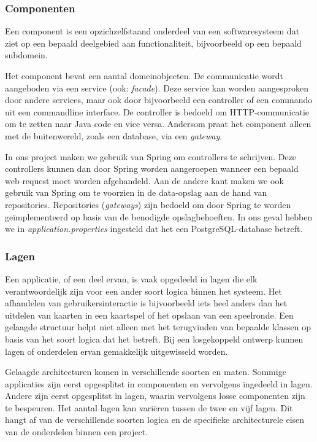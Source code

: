 \subsubsection{Componenten}
Een component is een opzichzelfstaand onderdeel van een softwaresysteem
dat ziet op een bepaald deelgebied aan functionaliteit, bijvoorbeeld op een 
bepaald subdomein.

Het component bevat een aantal domeinobjecten. 
De communicatie wordt aangeboden via een service (ook: \textit{facade}). 
Deze service kan worden aangesproken door andere
services, maar ook door bijvoorbeeld een controller of een commando uit een commandline interface. 
De controller is bedoeld om HTTP-communicatie om te zetten naar Java code en vice versa. 
Andersom praat het component alleen met de buitenwereld, zoals een database, via een \textit{gateway}.

In ons project maken we gebruik van Spring om controllers te schrijven.
Deze controllers kunnen dan door Spring worden aangeroepen 
wanneer een bepaald web request moet worden afgehandeld.
Aan de andere kant maken we ook gebruik van Spring om te voorzien in 
de data-opslag aan de hand van repositories.
Repositories (\textit{gateways}) zijn bedoeld om door Spring 
te worden geïmplementeerd op basis van de benodigde opslagbehoeften.
In ons geval hebben we in \textit{application.properties} ingesteld dat het 
een PostgreSQL-database betreft.

\subsubsection{Lagen}
Een applicatie, of een deel ervan, is vaak opgedeeld in lagen die 
elk verantwoordelijk zijn voor een ander soort logica binnen het systeem.
Het afhandelen van gebruikersinteractie 
is bijvoorbeeld iets heel anders dan het uitdelen van kaarten in een
kaartspel of het opslaan van een speelronde.
Een gelaagde structuur helpt niet alleen met het terugvinden van
bepaalde klassen op basis van het soort logica dat het betreft. Bij een 
losgekoppeld ontwerp kunnen lagen of onderdelen ervan gemakkelijk uitgewisseld worden.

Gelaagde architecturen komen in verschillende soorten en maten. Sommige applicaties 
zijn eerst opgesplitst in componenten en vervolgens ingedeeld in lagen. Andere zijn 
eerst opgesplitst in lagen, waarin vervolgens losse componenten zijn te bespeuren.
Het aantal lagen kan variëren tussen de twee en vijf lagen. Dit hangt af 
van de verschillende soorten logica en de specifieke architecturele eisen
van de onderdelen binnen een project.

